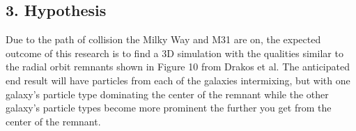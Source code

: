 \documentclass[linenumbers,trackchanges]{aastex7}
\begin{document}
\subsection{3. Hypothesis} \label{subsec:tables}
Due to the path of collision the Milky Way and M31 are on, the expected outcome of this research is to find a 3D simulation with the qualities similar to the radial orbit remnants shown in Figure 10 from Drakos et al. The anticipated end result will have particles from each of the galaxies intermixing, but with one galaxy’s particle type dominating the center of the remnant while the other galaxy's particle types become more prominent the further you get from the center of the remnant. 


{}



\end{document}
